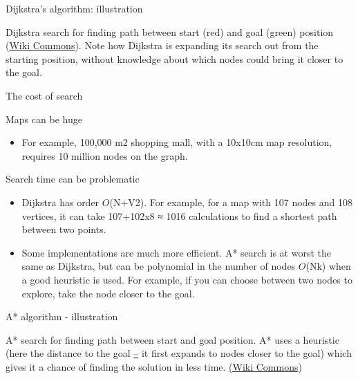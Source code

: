 \documentclass[compress]{beamer}
\begin{document}
\begin{frame}{Dijkstra's algorithm: illustration}

    \begin{center}
    \end{center}

Dijkstra search for finding path between start (red) and goal (green)
position (\href{http://en.wikipedia.org/wiki/Dijkstra's_algorithm}{Wiki
Commons}). Note how Dijkstra is expanding its search out from the
starting position, without knowledge about which nodes could bring it
closer to the goal.

\end{frame}

\begin{frame}{The cost of search}

Maps can be huge

\begin{itemize}
\item For example, 100,000 m2 shopping mall, with a 10x10cm map
  resolution, requires 10 million nodes on the graph.
\end{itemize}

Search time can be problematic

\begin{itemize}
\item Dijkstra has order $O$(N+V2). For example, for a map with 107
  nodes and 108 vertices, it can take 107+102x8 ≈ 1016 calculations to
  find a shortest path between two points.
\item Some implementations are much more efficient. A* search is at worst
  the same as Dijkstra, but can be polynomial in the number of nodes
  $O$(Nk) when a good heuristic is used. For example, if you can
  choose between two nodes to explore, take the node closer to the goal.
\end{itemize}

\end{frame}

\begin{frame}{A* algorithm - illustration}

    \begin{center}
    \end{center}

A* search for finding path between start and goal position. A* uses a
heuristic (here the distance to the goal
\href{http://en.wikipedia.org/wiki/A*_search_algorithm}{--} it first
expands to nodes closer to the goal) which gives it a chance of finding
the solution in less time.
\href{http://en.wikipedia.org/wiki/A*_search_algorithm}{(Wiki Commons})

\end{frame}
\end{document}
